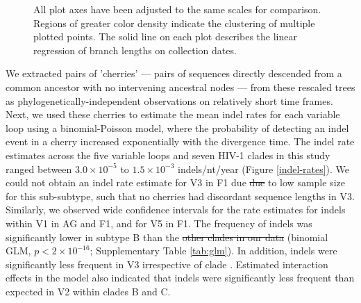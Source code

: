 \documentclass[12pt]{article}
\providecommand{\DIFadd}[1]{{\protect\color{blue}\uwave{#1}}} %
\providecommand{\DIFdel}[1]{{\protect\color{red}\sout{#1}}}                      %
\providecommand{\DIFaddbegin}{} %
\providecommand{\DIFaddend}{} %
\providecommand{\DIFdelbegin}{} %
\providecommand{\DIFdelend}{} %
\newcommand{\DIFscaledelfig}{0.5}
\newlength{\DIFdelgraphicswidth} %
\newlength{\DIFdelgraphicsheight} %
\newcommand{\DIFaddincludegraphics}[2][]{{\color{blue}\fbox{\DIFOincludegraphics[#1]{#2}}}} %
\newcommand{\DIFdelincludegraphics}[2][]{%
\sbox{\DIFdelgraphicsbox}{\DIFOincludegraphics[#1]{#2}}%
\settoboxwidth{\DIFdelgraphicswidth}{\DIFdelgraphicsbox} %
\settoboxtotalheight{\DIFdelgraphicsheight}{\DIFdelgraphicsbox} %
\scalebox{\DIFscaledelfig}{%
\parbox[b]{\DIFdelgraphicswidth}{\usebox{\DIFdelgraphicsbox}\\[-\baselineskip] \rule{\DIFdelgraphicswidth}{0em}}\llap{\resizebox{\DIFdelgraphicswidth}{\DIFdelgraphicsheight}{%
\setlength{\unitlength}{\DIFdelgraphicswidth}%
\begin{picture}(1,1)%
\thicklines\linethickness{2pt} %
{\color[rgb]{1,0,0}\put(0,0){\framebox(1,1){}}}%
{\color[rgb]{1,0,0}\put(0,0){\line( 1,1){1}}}%
{\color[rgb]{1,0,0}\put(0,1){\line(1,-1){1}}}%
\end{picture}%
}\hspace*{3pt}}} %
} %
\DeclareRobustCommand{\DIFaddbegin}{\DIFOaddbegin \let\includegraphics\DIFaddincludegraphics} %
\DeclareRobustCommand{\DIFaddend}{\DIFOaddend \let\includegraphics\DIFOincludegraphics} %
\DeclareRobustCommand{\DIFdelbegin}{\DIFOdelbegin \let\includegraphics\DIFdelincludegraphics} %
\DeclareRobustCommand{\DIFdelend}{\DIFOaddend \let\includegraphics\DIFOincludegraphics} %
\begin{document}
\begin{figure}
{    %
    All plot axes have been adjusted to the same scales for comparison. 
    Regions of greater color density indicate the clustering of multiple plotted points.  
    The solid line on each plot describes the linear regression of branch lengths on collection dates. 
    }
	\centering

    \label{branch-lengths}
\end{figure}

We extracted pairs of 'cherries' --- pairs of sequences directly descended from a common ancestor with no intervening ancestral nodes --- from these rescaled trees as phylo\-genetically-independent observations on relatively short time frames.
Next, we used these cherries to estimate the mean indel rates for each variable loop using a binomial-Poisson model, where the probability of detecting an indel event in a cherry increased exponentially with the divergence time.
The indel rate estimates across the five variable loops and seven HIV-1 clades in this study ranged between $3.0 \times10^{-5}$ to $1.5\times10^{-3}$ indels/nt/year (Figure \ref{indel-rates}). 
We could not obtain an indel rate estimate for V3 in F1 due \DIFdelbegin \DIFdel{due }\DIFdelend to low sample size for this sub-subtype, such that no cherries had discordant sequence lengths in V3.
Similarly, we observed wide confidence intervals for the rate estimates for indels within V1 in \DIFaddbegin \DIFadd{02\_}\DIFaddend AG and F1, and for V5 in F1.  
The frequency of indels was significantly lower in subtype B than the \DIFdelbegin \DIFdel{other clades in our data }\DIFdelend \DIFaddbegin \DIFadd{reference clade, 01\_AE }\DIFaddend (binomial GLM, $p<2\times 10^{-16}$; Supplementary Table \ref{tab:glm}).
In addition, indels were significantly less frequent in V3 irrespective of clade \DIFaddbegin \DIFadd{relative to V1}\DIFaddend .
Estimated interaction effects in the model also indicated that indels were significantly less frequent than expected in V2 within clades B and C.
\end{document}
